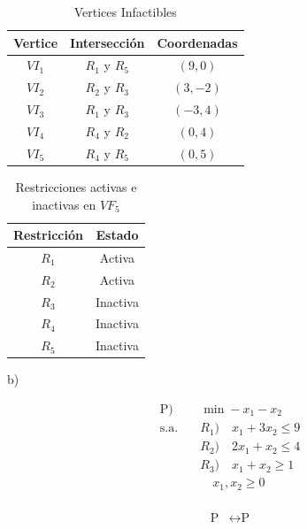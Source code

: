\documentclass{article}
\begin{document}
\begin{flushleft}
		\begin{table}[ht]
			\centering
			\begin{tabular}{ccc}
				\hline
				\textbf{Vertice} & \textbf{Intersección} & \textbf{Coordenadas} \\
				\hline
				${VI}_1$ & $R_1$ y $R_5$ & $(9, 0)$ \\
				${VI}_2$ & $R_2$ y $R_3$ & $(3, -2)$\\
				${VI}_3$ & $R_1$ y $R_3$  & $(-3, 4)$\\
				${VI}_4$ & $R_4$ y $R_2$ & $(0, 4)$ \\
				${VI}_5$ & $R_4$ y $R_5$  & $(0, 5)$ \\
				\hline
			\end{tabular}
			\caption{Vertices Infactibles}
			\label{tab:vertices_infactibles}
		\end{table}

		
		\begin{table}[ht]
			\centering
			\begin{tabular}{cc}
				\hline
				\textbf{Restricción} & \textbf{Estado} \\
				\hline
				$R_1$ & Activa \\
				$R_2$ & Activa \\
				$R_3$ & Inactiva \\
				$R_4$ & Inactiva \\
				$R_5$ & Inactiva \\
				\hline
			\end{tabular}
			\caption{Restricciones activas e inactivas en $VF_5$} 
			\label{tab:tabla_ejemplo}
		\end{table}

		b) \\
		\vspace{0,5cm}
		\begin{center}
			\begin{align*}
				\text{P}) & \quad \min -x_1 - x_2 \\
				\text{s.a.} & \quad  R_1) \quad x_1 + 3x_2 \leq  9 \\
						   & \quad R_2) \quad 2x_1 + x_2 \leq  4 \\
						   & \quad R_3) \quad x_1 + x_2 \geq  1 \\
						   & \quad \quad x_1, x_2 \geq 0 \\
			\end{align*}
		\end{center}
		\begin{center}
			\begin{align*}
				\text{P} & \leftrightarrow \text{P} \\
			\end{align*}
		\end{center}


\end{flushleft}
\end{document}
